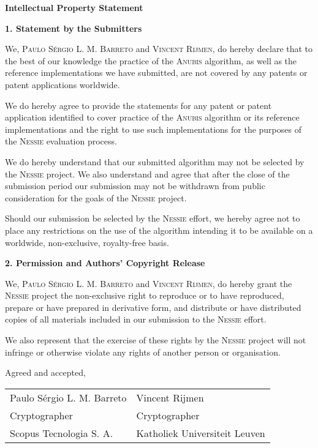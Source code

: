 \documentclass{letter}
\begin{document}
\pagestyle{empty}

\begin{center}
{\LARGE \sf \textbf{Intellectual Property Statement}}
\end{center}

\vspace{.5cm} {\large \sf \textbf{1. Statement by the Submitters}}

We, \textsc{Paulo S\'{e}rgio L. M. Barreto} and \textsc{Vincent
Rijmen}, do hereby declare that to the best of our knowledge the
practice of the \textsc{Anubis} algorithm, as well as the
reference implementations we have submitted, are not covered by
any patents or patent applications worldwide.

We do hereby agree to provide the statements for any patent or
patent application identified to cover practice of the
\textsc{Anubis} algorithm or its reference implementations and the
right to use such implementations for the purposes of the
\textsc{Nessie} evaluation process.

We do hereby understand that our submitted algorithm may not be
selected by the \textsc{Nessie} project. We also understand and
agree that after the close of the submission period our submission
may not be withdrawn from public consideration for the goals of
the \textsc{Nessie} project.

Should our submission be selected by the \textsc{Nessie} effort,
we hereby agree not to place any restrictions on the use of the
algorithm intending it to be available on a worldwide,
non-exclusive, royalty-free basis.

\vspace{.5cm} {\large \bf 2. Permission and Authors' Copyright
Release}

We, \textsc{Paulo S\'{e}rgio L. M. Barreto} and \textsc{Vincent
Rijmen}, do hereby grant the \textsc{Nessie} project the
non-exclusive right to reproduce or to have reproduced, prepare
or have prepared in derivative form, and distribute or have
distributed copies of all materials included in our submission to
the \textsc{Nessie} effort.

We also represent that the exercise of these rights by the
\textsc{Nessie} project will not infringe or otherwise violate
any rights of another person or organisation.

Agreed and accepted,

\vspace{2cm}

\begin{center}
\begin{tabular}{ll}
Paulo S\'{e}rgio L. M. Barreto \phantom{----------} & Vincent Rijmen\\
Cryptographer & Cryptographer \\
Scopus Tecnologia S. A. & Katholiek Universiteit Leuven
\end{tabular}
\end{center}
\end{document}
